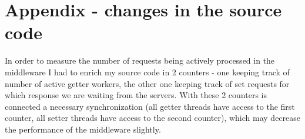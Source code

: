 \documentclass[11pt]{article}
\begin{document}
\pagebreak

\section*{Appendix - changes in the source code}

In order to measure the number of requests being actively processed in the middleware I had to enrich my source code in 2 counters - one keeping track of number of active getter workers, the other one keeping track of set requests for which response we are waiting from the servers. With these 2 counters is connected a necessary synchronization (all getter threads have access to the first counter, all setter threads have access to the second counter), which may decrease the performance of the middleware slightly.
\end{document}
